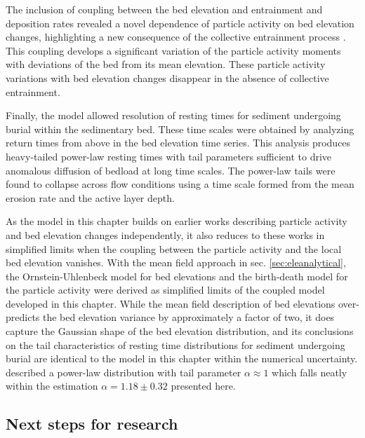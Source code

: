The inclusion of coupling between the bed elevation and entrainment and deposition rates revealed a novel dependence of particle activity on bed elevation changes, highlighting a new consequence of the collective entrainment process \citep{Ancey2008,Lee2018}. This coupling develops a significant variation of the particle activity moments with deviations of the bed from its mean elevation. These particle activity variations with bed elevation changes disappear in the absence of collective entrainment.

Finally, the model allowed resolution of resting times for sediment undergoing burial within the sedimentary bed. These time scales were obtained by analyzing return times from above in the bed elevation time series.
This analysis produces heavy-tailed power-law resting times with tail parameters sufficient to drive anomalous diffusion of bedload at long time scales.
The power-law tails were found to collapse across flow conditions using a time scale formed from the mean erosion rate and the active layer depth.

As the model in this chapter builds on earlier works describing particle activity and bed elevation changes independently, it also reduces to these works in simplified limits when the coupling between the particle activity and the local bed elevation vanishes.
With the mean field approach in sec. \ref{sec:eleanalytical}, the \citet{Martin2014} Ornstein-Uhlenbeck model for bed elevations and the \citet{Ancey2008} birth-death model for the particle activity were derived as simplified limits of the coupled model developed in this chapter.
While the mean field description of bed elevations over-predicts the bed elevation variance by approximately a factor of two, it does capture the Gaussian shape of the bed elevation distribution, and its conclusions on the tail characteristics of resting time distributions for sediment undergoing burial are identical to the model in this chapter within the numerical uncertainty.
\citet{Martin2014} described a power-law distribution with tail parameter $\alpha \approx 1$ which falls neatly within the estimation $\alpha = 1.18 \pm 0.32$ presented here.


\subsection{Next steps for research}

